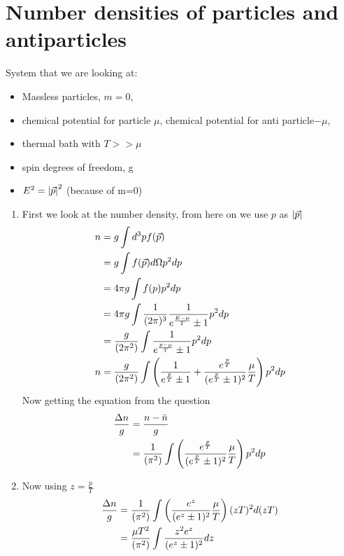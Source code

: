 \section{Number densities of particles and antiparticles}
System that we are looking at: 
\begin{itemize}
\item Massless particles, $m=0$,
\item chemical potential for particle $\mu$, chemical potential for anti particle$-\mu$,
\item thermal bath with $T>>\mu$
\item spin degrees of freedom, g
\item $E^2 = \abs{\vec{p}}^2$ (because of m=0)
\end{itemize}
\begin{enumerate}[label=(\alph*)]
\item First we look at the number density, from here on we use $p$ as $\abs{\vec{p}}$ 
\begin{align}
n 	&= g \int d^{3} p f( \vec{p} ) \\ \notag 
	&= g \int 	f(\vec{p}) d\Omega p^2 dp \notag \\
	&= 4\pi g \int 	f(p) p^2 dp \notag  \\ 
	&= 4\pi g \int 	\frac{1}{(2\pi)^3} \frac{1}{e^{\frac{E-\mu}{T}}\pm 1}p^2 dp \notag  \\ 
	&= \frac{g}{(2\pi^2)} \int \frac{1}{e^{\frac{p-\mu}{T}}\pm 1}p^2 dp \notag \\ 
n 	&= \frac{g}{(2\pi^2)} \int \left( \frac{1}{e^{\frac{p}{T}}\pm 1} + \frac{e^{\frac{p}{T}}}{(e^{\frac{p}{T}}\pm 1)^2}\frac{\mu}{T}\right)p^2 dp  
\end{align}
Now getting the equation from the question
\begin{align}
\frac{\Delta n}{g} 	&= \frac{n-\bar{n}}{g} \\ \notag
				&= \frac{1}{(\pi^2)} \int \left( \frac{e^{\frac{p}{T}}}{(e^{\frac{p}{T}}\pm 1)^2}\frac{\mu}{T}\right)p^2 dp \notag
\end{align}
\item  Now using $z=\frac{p}{T}$
\begin{align}
\frac{\Delta n}{g}	&= \frac{1}{(\pi^2)} \int \left( \frac{e^{z}}{(e^{z}\pm 1)^2} \frac{\mu}{T} \right)(zT)^2 d(zT) \\ \notag
				&= \frac{\mu T^2}{(\pi^2)} \int \frac{z^2 e^{z}}{(e^{z} \pm 1)^2} dz \notag
\end{align}
\end{enumerate}

